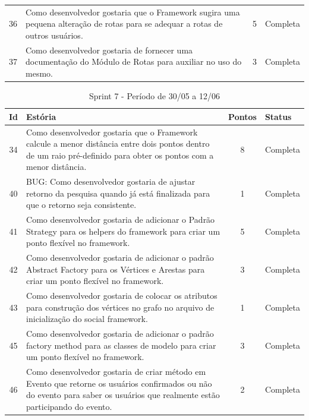\begin{apendicesenv}
\begin{table}[!h]
\begin{adjustbox}{width=\textwidth}
\begin{tabular}{@{}cp{10cm}cl@{}}
36 & Como desenvolvedor gostaria que o Framework sugira uma pequena alteração de rotas para se adequar a rotas de outros usuários. & 5 & Completa \\

37 & Como desenvolvedor gostaria de fornecer uma documentação do Módulo de Rotas para auxiliar no uso do mesmo. & 3 & Completa \\ \bottomrule
\end{tabular}
\end{adjustbox}
\end{table}

\begin{table}[!h]
\centering
\caption{Sprint 7 - Período de 30/05 a 12/06}
\label{sprint_7}
\begin{adjustbox}{width=\textwidth}
\begin{tabular}{@{}cp{10cm}cl@{}}
\toprule
\textbf{Id}  & \textbf{Estória} & \textbf{Pontos} & \textbf{Status} \\ \midrule
34 & Como desenvolvedor gostaria que o Framework calcule a menor distância entre dois pontos dentro de um raio pré-definido para obter os pontos com a menor distância. & 8 & Completa \\

40 & BUG: Como desenvolvedor gostaria de ajustar retorno da pesquisa quando já está finalizada para que o retorno seja consistente. & 1 & Completa \\

41 & Como desenvolvedor gostaria de adicionar o Padrão Strategy para os helpers do framework para criar um ponto flexível no framework. & 5 & Completa \\

42 & Como desenvolvedor gostaria de adicionar o padrão Abstract Factory para os Vértices e Arestas para criar um ponto flexível no framework. & 3 & Completa \\

43 & Como desenvolvedor gostaria de colocar  os atributos para construção dos vértices no grafo no arquivo de inicialização do social framework. & 1 & Completa \\

45 & Como desenvolvedor gostaria de adicionar o padrão factory method para as classes de modelo para criar um ponto flexível no framework. & 3 & Completa \\

46 & Como desenvolvedor gostaria de criar método em Evento que retorne os usuários confirmados ou não do evento para saber os usuários que realmente estão participando do evento. & 2 & Completa \\


\end{tabular}
\end{adjustbox}
\end{table}
\end{apendicesenv}
